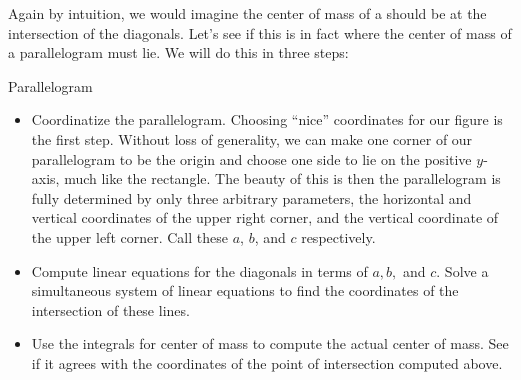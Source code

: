 Again by intuition, we would imagine the center of mass of a  should be at the intersection of the diagonals.  Let's see if this is in fact where the center of mass of a parallelogram must lie.  We will do this in three steps:
\begin{exercise}{Parallelogram \Coffeecup \Coffeecup}

\begin{itemize}

\item Coordinatize the parallelogram.  Choosing ``nice'' coordinates for our figure is the first step.  Without loss of generality, we can make one corner of our parallelogram to be the origin and choose one side to lie on the positive $y$-axis, much like the rectangle.  The beauty of this is then the parallelogram is fully determined by only three arbitrary parameters, the horizontal and vertical coordinates of the upper right corner, and the vertical coordinate of the upper left corner.  Call these $a$, $b$, and $c$ respectively.

\vspace*{2in}
 
\item Compute linear equations for the diagonals in terms of $a,b,$ and $c$.  Solve a simultaneous system of linear equations to find the coordinates of the intersection of these lines.


\item Use the integrals for center of mass to compute the actual center of mass.  See if it agrees with the coordinates of the point of intersection computed above.

\solushun{
$$M_y=\int_{x=0}^{x=a}x\left(\frac{b-c}{a}x+c-\frac{b-c}{a}x\right)\dif x=\int_{x=0}^{x=a} xc=\left.\frac{1}{2}cx^2\right|_{x=0}^{x=a}=\frac{1}{2}ca^2$$

\begin{align*}
M_x&=\int_{x=0}^{x=a}\frac{1}{2}\left(\frac{b-c}{a}x+c+\frac{b-c}{a}x\right)\left(\frac{b-c}{a}x+c-\frac{b-c}{a}x\right)\dif x\\
&=\int_{x=0}^{x=a}\frac{1}{2}\left(\frac{2(b-c)}{a}x+c\right)c\dif x\\
&=\int\frac{bc-c^2}{a}x+\frac{1}{2}c^2\dif x\\
&=\left.\frac{bc-c^2}{2a}x^2+\frac{1}{2}xc^2\right]_{x=0}^{x=a}\\
&=\frac{abc-ac^2}{2}+\frac{1}{2}ac^2=\frac{abc}{2}
\end{align*}

}
\end{itemize}
\end{exercise}

